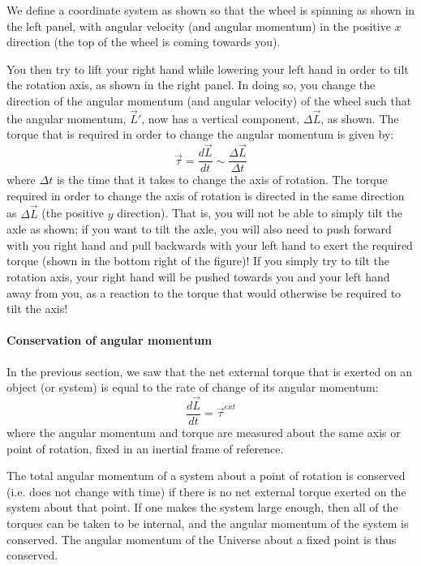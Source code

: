 We define a coordinate system as shown so that the wheel is spinning as shown in the left panel, with angular velocity (and angular momentum) in the positive $x$ direction (the top of the wheel is coming towards you).

You then try to lift your right hand while lowering your left hand in order to tilt the rotation axis, as shown in the right panel. In doing so, you change the direction of the angular momentum (and angular velocity) of the wheel such that the angular momentum, $\vec L'$, now has a vertical component, $\Delta \vec L$, as shown. The torque that is required in order to change the angular momentum is given by:
\begin{equation}
\vec \tau = \frac{d\vec L}{dt} \sim \frac{\Delta \vec L}{\Delta t}
\end{equation}
where $\Delta t$ is the time that it takes to change the axis of rotation. The torque required in order to change the axis of rotation is directed in the same direction as $\Delta \vec L$ (the positive $y$ direction). That is, you will not be able to simply tilt the axle as shown; if you want to tilt the axle, you will also need to push forward with you right hand and pull backwards with your left hand to exert the required torque (shown in the bottom right of the figure)! If you simply try to tilt the rotation axis, your right hand will be pushed towards you and your left hand away from you, as a reaction to the torque that would otherwise be required to tilt the axis!

\paragraph{Conservation of angular momentum}

In the previous section, we saw that the net external torque that is exerted on an object (or system) is equal to the rate of change of its angular momentum:
\begin{equation}
\frac{d\vec L}{dt} = \vec \tau^{ext}
\end{equation}
where the angular momentum and torque are measured about the same axis or point of rotation, fixed in an inertial frame of reference.

The total angular momentum of a system about a point of rotation is conserved (i.e. does not change with time) if there is no net external torque exerted on the system about that point. If one makes the system large enough, then all of the torques can be taken to be internal, and the angular momentum of the system is conserved. The angular momentum of the Universe about a fixed point is thus conserved.

